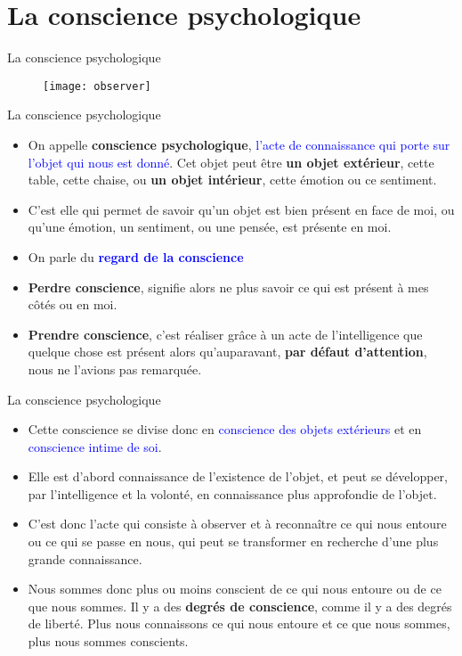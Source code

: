 \documentclass[11pt,xcolor=dvipsname,ignorenonframetext,handout]{beamer}
\begin{document}
\section{La conscience psychologique}
\begin{frame}{La conscience psychologique}
    {
        \begin{figure}
          \centering
          \texttt{[image: observer]}
        \end{figure}
          }    
\end{frame}
\begin{frame}{La conscience psychologique}
    \begin{itemize}
        \rightskip=0pt\leftskip=0pt
        \item On appelle \textbf{conscience psychologique}, \textcolor{blue}{l'acte de connaissance qui porte sur l'objet qui nous est donné}. Cet objet peut être \textbf{un objet extérieur}, cette table, cette chaise, ou \textbf{un objet intérieur}, cette émotion ou ce sentiment.
        \item C'est elle qui permet de savoir qu'un objet est bien présent en face de moi, ou qu'une émotion, un sentiment, ou une pensée, est présente en moi.
        \item On parle du \textcolor{blue}{\textbf{regard de la conscience}}
        \item \textbf{Perdre conscience}, signifie alors ne plus savoir ce qui est présent à mes côtés ou en moi.
        \item \textbf{Prendre conscience}, c'est réaliser grâce à un acte de l'intelligence que quelque chose est présent alors qu'auparavant, \textbf{par défaut d'attention}, nous ne l'avions pas remarquée.
    \end{itemize}
\end{frame}
\begin{frame}{La conscience psychologique}
    \begin{itemize}
        \rightskip=0pt\leftskip=0pt
        \item Cette conscience se divise donc en \textcolor{blue}{conscience des objets extérieurs} et en \textcolor{blue}{conscience intime de soi}.
        \item Elle est d'abord connaissance de l'existence de l'objet, et peut se développer, par l'intelligence et la volonté, en connaissance plus approfondie de l'objet.
        \item C'est donc l'acte qui consiste à observer et à reconnaître ce qui nous entoure ou ce qui se passe en nous, qui peut se transformer en recherche d'une plus grande connaissance.
        \item Nous sommes donc plus ou moins conscient de ce qui nous entoure ou de ce que nous sommes. Il y a des \textbf{degrés de conscience}, comme il y a des degrés de liberté. Plus nous connaissons ce qui nous entoure et ce que nous sommes, plus nous sommes conscients.
    \end{itemize}
\end{frame}
\end{document}
